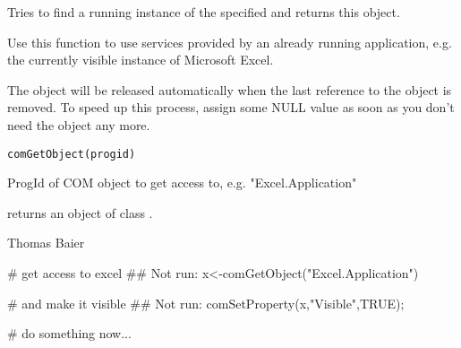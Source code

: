 \begin{Description}\relax
Tries to find a running instance of the specified  and returns
this object.

Use this function to use services provided by an already running application,
e.g. the currently visible instance of Microsoft Excel.

The object will be released automatically when the last reference to the
object is removed. To speed up this process, assign some NULL value as soon
as you don't need the object any more.
\end{Description}
\begin{Usage}
\begin{verbatim}
comGetObject(progid)
\end{verbatim}
\end{Usage}
\begin{Arguments}
\begin{ldescription}
\item[\code{progid}] ProgId of COM object to get access to, e.g. "Excel.Application"
\end{ldescription}
\end{Arguments}
\begin{Value}
 returns an object of class .
\end{Value}
\begin{Author}\relax
Thomas Baier
\end{Author}
\begin{Examples}
\begin{ExampleCode}
# get access to excel
## Not run: x<-comGetObject("Excel.Application")

# and make it visible
## Not run: comSetProperty(x,"Visible",TRUE);

# do something now...
\end{ExampleCode}
\end{Examples}

